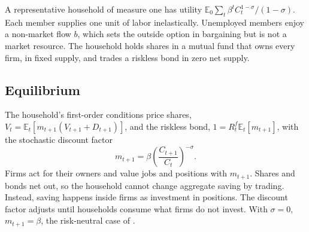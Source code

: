 \documentclass[authoryear, review, 12pt]{elsarticle}
\newcommand{\E}{\mathbb{E}}
\begin{document}
A representative household of measure one has utility $\E_0\sum_t\beta^tC_t^{1-\sigma}/(1-\sigma)$. Each member supplies one unit of labor inelastically. Unemployed members enjoy a non-market flow $b$, which sets the outside option in bargaining but is not a market resource. The household holds shares in a mutual fund that owns every firm, in fixed supply, and trades a riskless bond in zero net supply.

\subsection{Equilibrium}\label{sec:equilibrium}

The household's first-order conditions price shares, $V_t=\E_t[m_{t+1}(V_{t+1}+D_{t+1})]$, and the riskless bond, $1=R^f_t\E_t[m_{t+1}]$, with the stochastic discount factor
\begin{equation}\label{eq:sdf}
m_{t+1} = \beta\left(\frac{C_{t+1}}{C_t}\right)^{-\sigma}.
\end{equation}
Firms act for their owners and value jobs and positions with $m_{t+1}$. Shares and bonds net out, so the household cannot change aggregate saving by trading. Instead, saving happens inside firms as investment in positions. The discount factor adjusts until households consume what firms do not invest. With $\sigma=0$, $m_{t+1}=\beta$, the risk-neutral case of \citet{gabrovski_2025}.
\end{document}
